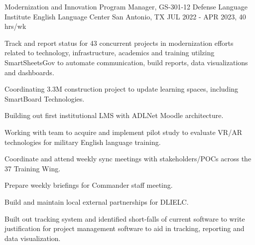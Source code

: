 \begin{cventries}
\cventry
{Modernization and Innovation Program Manager, GS-301-12} %
{Defense Language Institute English Language Center} %
{San Antonio, TX} %
{JUL 2022 - APR 2023, 40 hrs/wk} %
{ %
\begin{cvitems}
\item {Track and report status for 43 concurrent projects in modernization efforts related to technology, infrastructure, academics and training utilzing SmartSheetsGov to automate communication, build reports, data visualizations and dashboards.}
\item {Coordinating 3.3M construction project to update learning spaces, including SmartBoard Technologies.}
\item {Building out first institutional LMS with ADLNet Moodle architecture.}
\item {Working with team to acquire and implement pilot study to evaluate VR/AR technologies for military English language training.}
\item {Coordinate and attend weekly sync meetings with stakeholders/POCs across the 37 Training Wing.}
\item {Prepare weekly briefings for Commander staff meeting.}
\item {Build and maintain local external partnerships for DLIELC.}
\item {Built out tracking system and identified short-falls of current software to write justification for project management software to aid in tracking, reporting and data visualization.} 
\end{cvitems}
}


\end{cventries}

